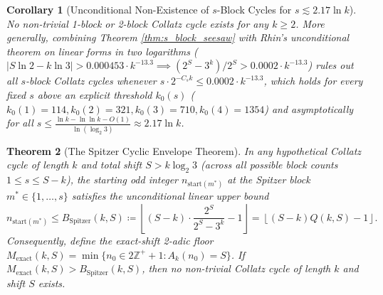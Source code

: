 \documentclass[11pt, a4paper]{amsart}
\newtheorem{theorem}{Theorem}[section]
\newtheorem{corollary}[theorem]{Corollary}
\theoremstyle{definition}
\newcommand{\Z}{\mathbb{Z}}
\begin{document}
\begin{corollary}[Unconditional Non-Existence of $s$-Block Cycles for $s \lesssim 2.17 \ln k$]\label{cor:s_block_kill}
No non-trivial 1-block or 2-block Collatz cycle exists for any $k \ge 2$. More generally, combining Theorem \ref{thm:s_block_seesaw} with Rhin's unconditional theorem on linear forms in two logarithms \cite{Rhin1987} ($|S \ln 2 - k \ln 3| > 0.000453 \cdot k^{-13.3} \implies (2^S - 3^k)/2^S > 0.0002 \cdot k^{-13.3}$) rules out all $s$-block Collatz cycles whenever $s \cdot 2^{-C_s k} \le 0.0002 \cdot k^{-13.3}$, which holds for every fixed $s$ above an explicit threshold $k_0(s)$ ($k_0(1)=114, k_0(2)=321, k_0(3)=710, k_0(4)=1354$) and asymptotically for all $s \le \frac{\ln k - \ln \ln k - O(1)}{\ln(\log_2 3)} \approx 2.17 \ln k$.
\end{corollary}

\begin{theorem}[The Spitzer Cyclic Envelope Theorem]\label{thm:spitzer_envelope}
In any hypothetical Collatz cycle of length $k$ and total shift $S > k \log_2 3$ (across all possible block counts $1 \le s \le S - k$), the starting odd integer $n_{\text{start}(m^*)}$ at the Spitzer block $m^* \in \{1, \dots, s\}$ satisfies the unconditional linear upper bound
\begin{equation}\label{eq:spitzer_bound}
n_{\text{start}(m^*)} \le B_{\text{Spitzer}}(k, S) \coloneqq \left\lfloor (S - k) \cdot \frac{2^S}{2^S - 3^k} - 1 \right\rfloor = \left\lfloor (S - k) Q(k, S) - 1 \right\rfloor.
\end{equation}
Consequently, define the \emph{exact-shift 2-adic floor} $M_{\text{exact}}(k, S) = \min \{ n_0 \in 2\Z^+ + 1 : A_k(n_0) = S \}$. If $M_{\text{exact}}(k, S) > B_{\text{Spitzer}}(k, S)$, then no non-trivial Collatz cycle of length $k$ and shift $S$ exists.
\end{theorem}
\end{document}

